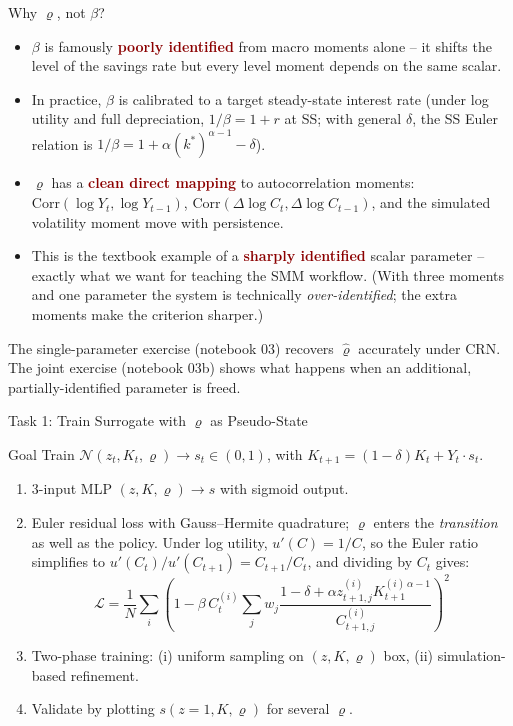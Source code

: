 \documentclass[10pt,aspectratio=169]{beamer}
\newcommand{\emphc}[1]{\textbf{\textcolor{darkred}{#1}}}
\begin{document}
\begin{frame}{Why $\varrho$, not $\beta$?}
\small
\begin{itemize}
  \item $\beta$ is famously \emphc{poorly identified} from macro moments alone -- it shifts the level of the savings rate but every level moment depends on the same scalar.
  \item In practice, $\beta$ is calibrated to a target steady-state interest rate (under log utility and full depreciation, $1/\beta = 1+r$ at SS; with general $\delta$, the SS Euler relation is $1/\beta = 1 + \alpha (k^*)^{\alpha-1} - \delta$).
  \item $\varrho$ has a \emphc{clean direct mapping} to autocorrelation moments: $\mathrm{Corr}(\log Y_t, \log Y_{t-1})$, $\mathrm{Corr}(\Delta\log C_t, \Delta\log C_{t-1})$, and the simulated volatility moment move with persistence.
  \item This is the textbook example of a \emphc{sharply identified} scalar parameter -- exactly what we want for teaching the SMM workflow. (With three moments and one parameter the system is technically \emph{over-identified}; the extra moments make the criterion sharper.)
\end{itemize}
\vspace{0.2cm}
The single-parameter exercise (notebook 03) recovers $\hat\varrho$ accurately under CRN. The joint exercise (notebook 03b) shows what happens when an additional, partially-identified parameter is freed.
\end{frame}

\begin{frame}{Task 1: Train Surrogate with $\varrho$ as Pseudo-State}
\begin{block}{Goal}
Train $\mathcal{N}(z_t, K_t, \varrho) \to s_t \in (0,1)$, with $K_{t+1} = (1-\delta)K_t + Y_t \cdot s_t$.
\end{block}
\begin{enumerate}
  \itemsep1pt
  \item 3-input MLP $(z, K, \varrho) \to s$ with sigmoid output.
  \item Euler residual loss with Gauss--Hermite quadrature; $\varrho$ enters the \emph{transition} as well as the policy. Under log utility, $u'(C) = 1/C$, so the Euler ratio simplifies to $u'(C_t)/u'(C_{t+1}) = C_{t+1}/C_t$, and dividing by $C_t$ gives:
  {\small\[
  \mathcal{L} = \frac{1}{N}\sum_i \!\left(1 - \beta\, C^{(i)}_t \sum_j w_j \frac{1-\delta + \alpha z^{(i)}_{t+1,j} K^{(i)\,\alpha-1}_{t+1}}{C^{(i)}_{t+1,j}}\right)^{\!2}
  \]}
  \vspace{-10pt}
  \item Two-phase training: (i) uniform sampling on $(z, K, \varrho)$ box, (ii) simulation-based refinement.
  \item Validate by plotting $s(z=1, K, \varrho)$ for several $\varrho$.
\end{enumerate}
\end{frame}
\end{document}
